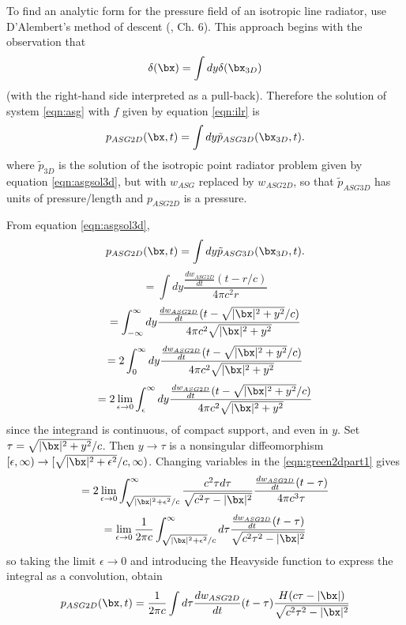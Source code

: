 To find an analytic form for the pressure field of an isotropic line radiator, use D'Alembert's method of descent (\cite[]{CouHil:62}, Ch. 6). This approach begins with the observation that
\[
\delta(\bx) = \int dy \delta(\bx_{3D})
\]
(with the right-hand side interpreted as a pull-back). Therefore the solution of system \ref{eqn:asg} with $f$ given by equation \ref{eqn:ilr} is  
\begin{equation}
\label{eqn:descent}
p_{ASG2D}(\bx,t) = \int dy \tilde{p}_{ASG3D}(\bx_{3D},t).
\end{equation}
where $\tilde{p}_{3D}$ is the solution of the isotropic point radiator problem given by equation \ref{eqn:asgsol3d}, but with $w_{ASG}$ replaced by $w_{ASG2D}$, so that $\tilde{p}_{ASG3D}$ has units of pressure/length and $p_{ASG2D}$ is a pressure.

From equation \ref{eqn:asgsol3d},
\[
p_{ASG2D}(\bx,t) = \int dy \tilde{p}_{ASG3D}(\bx_{3D},t).
\]
\[
= \int dy \frac{\frac{dw_{ASG2D}}{dt}(t-r/c)}{4\pi c^2 r}
\]
\[
= \int_{-\infty}^{\infty} dy \frac{\frac{dw_{ASG2D}}{dt}(t-\sqrt{|\bx|^2 + y^2}/c)}{4\pi c^2 \sqrt{|\bx|^2 + y^2}}
\]
\[
= 2 \int_0^{\infty} dy \frac{\frac{dw_{ASG2D}}{dt}(t-\sqrt{|\bx|^2 + y^2}/c)}{4\pi c^2 \sqrt{|\bx|^2 + y^2}}
\]
\begin{equation}
\label{eqn:green2dpart1}
= 2 \lim_{\epsilon \rightarrow 0}\int_{\epsilon}^{\infty} dy \frac{\frac{dw_{ASG2D}}{dt}(t-\sqrt{|\bx|^2 + y^2}/c)}{4\pi c^2\sqrt{|\bx|^2 + y^2}}
\end{equation}
since the integrand is continuous, of compact support, and even in $y$. Set $\tau = \sqrt{|\bx|^2 + y^2}/c$. Then $y \rightarrow \tau$ is a nonsingular diffeomorphism $[\epsilon,\infty) \rightarrow [\sqrt{|\bx|^2+\epsilon^2}/c,\infty)$. Changing variables in the \ref{eqn:green2dpart1} gives
\[
= 2 \lim_{\epsilon \rightarrow 0} \int_{\sqrt{|\bx|^2+\epsilon^2}/c}^{\infty} \frac{c^2 \tau d\tau}{\sqrt{c^2 \tau - |\bx|^2}} \frac{\frac{dw_{ASG2D}}{dt}(t-\tau)}{4\pi c^3 \tau} 
\]
\[
=\lim_{\epsilon \rightarrow 0} \frac{1}{2\pi c}\int_{\sqrt{|\bx|^2+\epsilon^2}/c}^{\infty} d\tau \frac{\frac{dw_{ASG2D}}{dt}(t-\tau)}{\sqrt{c^2 \tau^2 -|\bx|^2}}
\]
so taking the limit $\epsilon \rightarrow 0$ and introducing the Heavyside function to express the integral as a convolution, obtain
\begin{equation}
\label{eqn:asgsol2d}
p_{ASG2D}(\bx,t) = \frac{1}{2\pi c}\int d\tau \frac{dw_{ASG2D}}{dt}(t-\tau)\frac{H(c\tau-|\bx|)}{\sqrt{c^2 \tau^2 -|\bx|^2}}
\end{equation}


